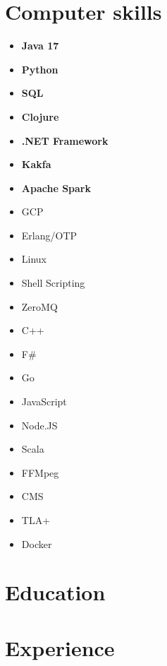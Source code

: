 \documentclass[11pt,a4paper,roman,english]{moderncv}        %
\begin{document}


\makecvtitle
\section{Computer skills}
\begin{multicols}{4}
	\begin{itemize}
		\item[] \textbf{Java 17}
		\item[] \textbf{Python}
		\item[] \textbf{SQL}
		\item[] \textbf{Clojure}
		\item[] \textbf{.NET Framework}
		\item[] \textbf{Kakfa}
		\item[] \textbf{Apache Spark}
		\item[] GCP
		\item[] Erlang/OTP
		\item[] Linux
		\item[] Shell Scripting
		\item[] ZeroMQ
		\item[] C++
		\item[] F\#
		\item[] Go
		\item[] JavaScript
		\item[] Node.JS
		\item[] Scala
		\item[] FFMpeg
		\item[] CMS
        \item[] TLA+
        \item[] Docker
	\end{itemize}
\end{multicols}
\section{Education}
\section{Experience}
\end{document}
